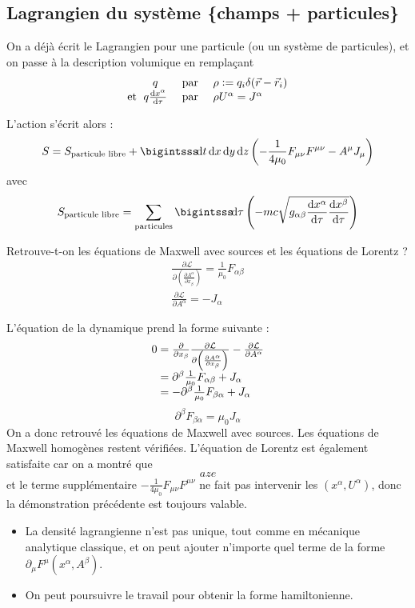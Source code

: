 \subsection{Lagrangien du système \{champs + particules\}}
On a déjà écrit le Lagrangien pour une particule (ou un système de particules), et on passe à la description volumique en remplaçant 
$$
	\begin{array}{r@{\;}ccl}
		&q&\text{ par }&\rho\defeq q_i\delta(\vec{r}-\vec{r}_i)\\
		\text{et }&q\frac{\dif x^\alpha}{\dif \tau}&\text{ par }&\rho U^\alpha=J^\alpha
	\end{array}
$$

L'action s'écrit alors :
$$
	S=S_{\text{particule libre}}+\bigintsss\!\dif t\,\dif x\,\dif y\,\dif z\left(-\frac{1}{4\mu_0}F_{\mu\nu}F^{\mu\nu}-A^\mu J_\mu\right)
$$
avec 
$$
	S_{\text{particule libre}}=\sum_{\text{particules}}\bigintsss\!\dif\tau\left(-mc\sqrt{g_{\alpha\beta}\frac{\dif x^\alpha}{\dif\tau}\frac{\dif x^\beta}{\dif\tau}}\right)
$$

Retrouve-t-on les équations de Maxwell avec sources et les équations de Lorentz ?
$$
	\begin{array}{c}
		\frac{\partial\mathcal{L}}{\partial\left(\frac{\partial A^{\alpha}}{\partial x_{\beta}}\right)}=\frac{1}{\mu_0}F_{\alpha\beta}\\
		\frac{\partial \mathcal{L}}{\partial A^\alpha}=-J_\alpha
	\end{array}
$$

L'équation de la dynamique prend la forme suivante :
$$
	\begin{array}{r@{\;}l}
		0&=\frac{\partial}{\partial x_{\beta}}\frac{\partial\mathcal{L}}{\partial\left(\frac{\partial A^\alpha}{\partial x_{\beta}}\right)}-\frac{\partial\mathcal{L}}{\partial A^\alpha}\\
		&=\partial^\beta\frac{1}{\mu_0}F_{\alpha\beta}+J_\alpha\\
		&=-\partial^\beta\frac{1}{\mu_0}F_{\beta\alpha}+J_\alpha
	\end{array}
$$
$$
	\boxed{\partial^\beta F_{\beta\alpha}=\mu_0 J_\alpha}
$$
On a donc retrouvé les équations de Maxwell avec sources. Les équations de Maxwell homogènes restent vérifiées. L'équation de Lorentz est également satisfaite car on a montré que 
$$
aze	
$$
et le terme supplémentaire $-\frac{1}{4\mu_0}F_{\mu\nu}F^{\mu\nu}$ ne fait pas intervenir les $(x^\alpha,U^\alpha)$, donc la démonstration précédente est toujours valable.

\begin{remarks}\hspace*{1em}
	\begin{itemize}
		\item La densité lagrangienne n'est pas unique, tout comme en mécanique analytique classique, et on peut ajouter n'importe quel terme de la forme $\partial_\mu F^\mu(x^\alpha,A^\beta)$.
		\item On peut poursuivre le travail pour obtenir la forme hamiltonienne.
	\end{itemize}
\end{remarks}

